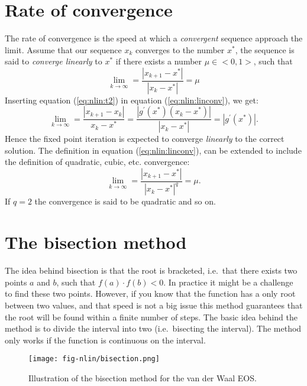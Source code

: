 \documentclass[graybox,sectrefs,envcountresetchap,open=right,final]{svmonodo}
\begin{document}
\section{Rate of convergence}
The rate of convergence is the speed at which a \emph{convergent} sequence approach the limit. Assume that our sequence $x_{k}$ converges to the number $x^*$, the sequence is said to \emph{converge linearly} to $x^*$ if there exists a number $\mu\in<0,1>$, such that
\begin{equation}
\lim_{k\to\infty}=\frac{|x_{k+1}-x^*|}{|x_k-x^*|}=\mu
\label{eq:nlin:linconv}
\end{equation}
Inserting equation (\ref{eq:nlin:t2}) in equation (\ref{eq:nlin:linconv}), we get:
\begin{equation}
\lim_{k\to\infty}=\frac{|x_{k+1}-x_k|}{x_k-x^*}
=\frac{|g^\prime(x^*)(x_k-x^*)|}{|x_k-x^*|}=|g^\prime(x^*)|.
\label{eq:nlin:ling}
\end{equation}
Hence the fixed point iteration is expected to converge \emph{linearly} to the correct solution. The definition in equation (\ref{eq:nlin:linconv}), can be extended to include the definition of quadratic, cubic, etc. convergence:
\begin{equation}
\lim_{k\to\infty}=\frac{|x_{k+1}-x^*|}{|x_k-x^*|^q}=\mu.
\label{eq:nlin:qconv}
\end{equation}
If $q=2$ the convergence is said to be quadratic and so on.

\section{The bisection method}
The idea behind bisection is that the root is bracketed, i.e.~that there exists two points $a$ and $b$, such that $f(a)\cdot f(b)<0$. In practice it might be a challenge to find these two points. However, if you know that the function has a only root between two values, and that speed is not a big issue this method guarantees that the root will be found within a finite number of steps. The basic idea behind the method is to divide the interval into two (i.e.~bisecting the interval). The method only works if the function is continuous on the interval. 

\begin{figure}[!ht]  %
  \centerline{\texttt{[image: fig-nlin/bisection.png]}}
  \caption{
  Illustration of the bisection method for the van der Waal EOS. \label{fig:nlin:bisection}
  }
\end{figure}
\end{document}
